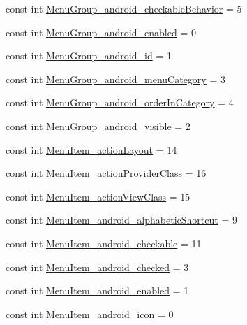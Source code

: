 \begin{CompactItemize}
\item 
const int \hyperlink{class__2doo_1_1_droid_1_1_resource_1_1_styleable_90914b6d547956ccf2c4982ce5c9ad66}{MenuGroup\_\-android\_\-checkableBehavior} = 5
\item 
const int \hyperlink{class__2doo_1_1_droid_1_1_resource_1_1_styleable_e55810ee34c1d6dc611b730ef6b43ad1}{MenuGroup\_\-android\_\-enabled} = 0
\item 
const int \hyperlink{class__2doo_1_1_droid_1_1_resource_1_1_styleable_f4d9be6f6b3934e09a297fa7b90db371}{MenuGroup\_\-android\_\-id} = 1
\item 
const int \hyperlink{class__2doo_1_1_droid_1_1_resource_1_1_styleable_c745c90476e2f455c3bb0927b5d6dbad}{MenuGroup\_\-android\_\-menuCategory} = 3
\item 
const int \hyperlink{class__2doo_1_1_droid_1_1_resource_1_1_styleable_f3eeeba16588c139e3d44acce9a90706}{MenuGroup\_\-android\_\-orderInCategory} = 4
\item 
const int \hyperlink{class__2doo_1_1_droid_1_1_resource_1_1_styleable_c691af6c6099cafd542ab71d20608d25}{MenuGroup\_\-android\_\-visible} = 2
\item 
const int \hyperlink{class__2doo_1_1_droid_1_1_resource_1_1_styleable_622a951884131fdf0de2173aa7f6d1a5}{MenuItem\_\-actionLayout} = 14
\item 
const int \hyperlink{class__2doo_1_1_droid_1_1_resource_1_1_styleable_b65d0722ae0c1a4cc14854f1cfbf3ad9}{MenuItem\_\-actionProviderClass} = 16
\item 
const int \hyperlink{class__2doo_1_1_droid_1_1_resource_1_1_styleable_c3ba37864801f18c1389bedd765af1ff}{MenuItem\_\-actionViewClass} = 15
\item 
const int \hyperlink{class__2doo_1_1_droid_1_1_resource_1_1_styleable_d4363d46b8d715549f47f334aac4a5a4}{MenuItem\_\-android\_\-alphabeticShortcut} = 9
\item 
const int \hyperlink{class__2doo_1_1_droid_1_1_resource_1_1_styleable_febf97cdc64557624d7c64989d4efe2e}{MenuItem\_\-android\_\-checkable} = 11
\item 
const int \hyperlink{class__2doo_1_1_droid_1_1_resource_1_1_styleable_8dca70cee965173c5cedc5416b04604a}{MenuItem\_\-android\_\-checked} = 3
\item 
const int \hyperlink{class__2doo_1_1_droid_1_1_resource_1_1_styleable_f6cf43b9e4440019944cd6e5f0b78673}{MenuItem\_\-android\_\-enabled} = 1
\item 
const int \hyperlink{class__2doo_1_1_droid_1_1_resource_1_1_styleable_5cfbf33e19f1e4e44b29169d255bcba6}{MenuItem\_\-android\_\-icon} = 0

\end{CompactItemize}
